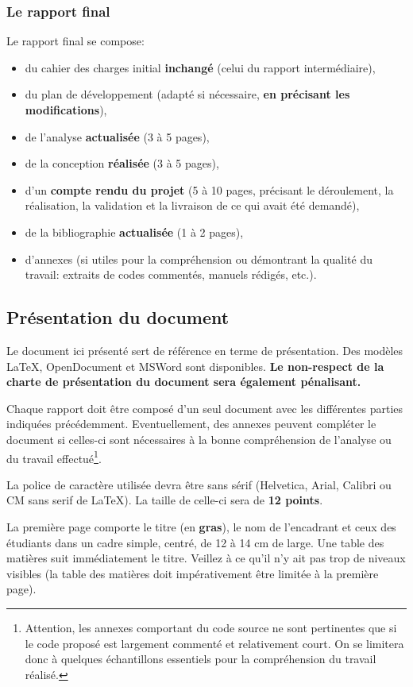 \documentclass[a4paper,12pt]{article}
\begin{document}
\subsubsection{Le rapport final}
Le rapport final se compose:
\begin{itemize}
\item du cahier des charges initial \textbf{inchangé} (celui du rapport intermédiaire),
\item du plan de développement (adapté si nécessaire, \textbf{en précisant les modifications}),
\item de l'analyse \textbf{actualisée} (3 à 5 pages),
\item de la conception \textbf{réalisée} (3 à 5 pages),
\item d'un \textbf{compte rendu du projet} (5 à 10 pages, précisant le déroulement,
  la réalisation, la validation et la livraison de ce qui avait été
  demandé),
\item de la bibliographie \textbf{actualisée} (1 à 2 pages),
\item d'annexes (si utiles pour la compréhension ou démontrant la qualité du
travail: extraits de codes commentés, manuels rédigés, etc.).
\end{itemize}



\subsection{Présentation du document}
Le document ici présenté sert de référence en terme de présentation. Des
modèles \LaTeX, OpenDocument et MSWord sont disponibles.
\textbf{Le non-respect de la charte de présentation du document sera également
pénalisant.}

Chaque rapport doit être composé d'un seul document avec les différentes
parties indiquées précédemment. Eventuellement, des annexes peuvent compléter
le document si celles-ci sont nécessaires à la bonne compréhension de
l'analyse ou du travail effectué\footnote{Attention, les annexes comportant
  du code source ne sont pertinentes que si le code proposé est largement
  commenté et relativement court. On se limitera donc à quelques échantillons
  essentiels pour la compréhension du travail réalisé.}.

La police de caractère utilisée devra être sans sérif (Helvetica, Arial, Calibri ou CM sans serif de LaTeX). La taille de celle-ci sera de \textbf{12 points}.

La première page comporte le titre (en \textbf{gras}), le nom de l'encadrant
et ceux des étudiants dans un cadre simple, centré, de 12 à 14 cm de large. Une
table des matières suit immédiatement le titre. Veillez à ce qu'il n'y ait pas
trop de niveaux visibles (la table des matières doit impérativement être limitée à la première
page).
\end{document}
